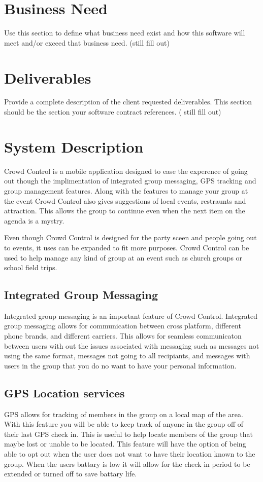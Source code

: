 \section{Business Need}
Use this section to define what business need exist and how this software will 
meet and/or exceed that business need.   (still fill out)


\section{Deliverables}

Provide a complete description of the client requested deliverables.   This section should be the section your software contract references.   ( still fill out)

\section{System Description}
Crowd Control is a mobile application designed to ease the experence of going out though the implimentation of integrated group messaging, GPS tracking and group management features. Along with the features to manage your group at the event Crowd Control also gives suggestions of local events, restraunts and attraction. This allows the group to continue even when the next item on the agenda is a mystry. 


Even though Crowd Control is designed for the party sceen and people going out to events, it uses can be expanded to fit more purposes. Crowd Control can be used to help manage any kind of group at an event such as church groups or school field trips.


\subsection{Integrated Group Messaging}
Integrated group messaging is an important feature of Crowd Control. Integrated group messaging allows for communication between cross platform, different phone brands, and different carriers. This allows for seamless communicaton between users with out the issues associated with messaging such as messages not using the same format, messages not going to all recipiants, and messages with users in the group that you do no want to have your personal information.

\subsection{GPS Location services}
GPS allows for tracking of members in the group on a local map of the area. With this feature you will be able to keep track of anyone in the group off of their last GPS check in. This is useful to help locate members of the group that maybe lost or unable to be located. This feature will have the option of being able to opt out when the user does not want to have their location known to the group. When the users battary is low it will allow for the check in period to be extended or turned off to save battary life.

